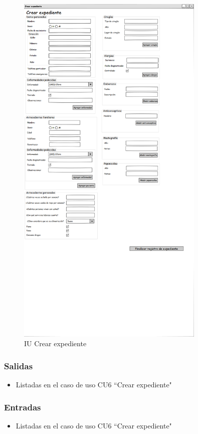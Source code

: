 \begin{figure}[htbp!]
	\centering
	\includegraphics[width=0.8\textwidth]{images/IU_crear_expediente}
	\caption{IU Crear expediente}
\end{figure}


\subsubsection{Salidas}
\begin{itemize} 
	\item Listadas en el caso de uso CU6 ``Crear expediente"
\end{itemize}
\subsubsection{Entradas}
\begin{itemize}
	\item Listadas en el caso de uso CU6 ``Crear expediente"
\end{itemize}

